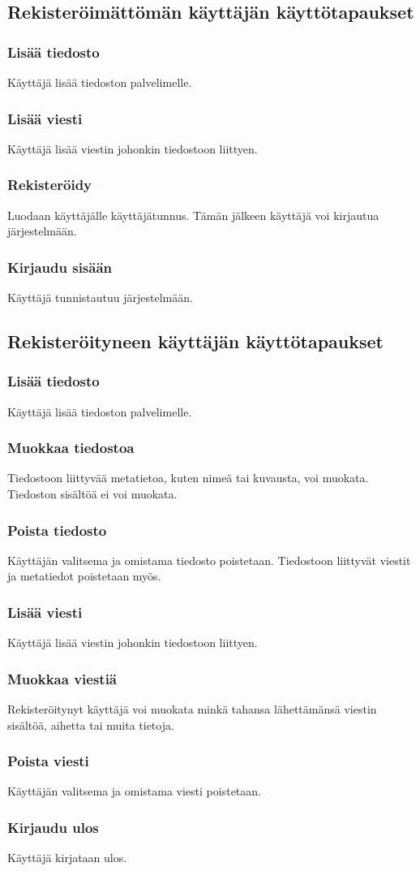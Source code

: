 \documentclass[10pt,a4paper]{article}
\begin{document}
\subsection{Rekisteröimättömän käyttäjän käyttötapaukset}
\subsubsection{Lisää tiedosto}
Käyttäjä lisää tiedoston palvelimelle.
\subsubsection{Lisää viesti}
Käyttäjä lisää viestin johonkin tiedostoon liittyen.

\subsubsection{Rekisteröidy}
Luodaan käyttäjälle käyttäjätunnus. Tämän jälkeen käyttäjä voi kirjautua järjestelmään.
\subsubsection{Kirjaudu sisään}
Käyttäjä tunnistautuu järjestelmään.


\subsection{Rekisteröityneen käyttäjän käyttötapaukset}
\subsubsection{Lisää tiedosto}
Käyttäjä lisää tiedoston palvelimelle.
\subsubsection{Muokkaa tiedostoa}
Tiedostoon liittyvää metatietoa, kuten nimeä tai kuvausta, voi muokata. Tiedoston sisältöä ei voi muokata.
\subsubsection{Poista tiedosto}
Käyttäjän valitsema ja omistama tiedosto poistetaan. Tiedostoon liittyvät viestit ja metatiedot poistetaan myös.

\subsubsection{Lisää viesti}
Käyttäjä lisää viestin johonkin tiedostoon liittyen.
\subsubsection{Muokkaa viestiä}
Rekisteröitynyt käyttäjä voi muokata minkä tahansa lähettämänsä viestin sisältöä, aihetta tai muita tietoja.
\subsubsection{Poista viesti}
Käyttäjän valitsema ja omistama viesti poistetaan.

\subsubsection{Kirjaudu ulos}
Käyttäjä kirjataan ulos.
\end{document}
